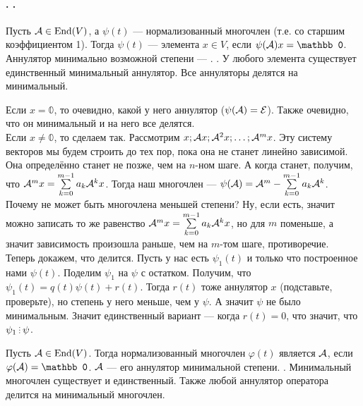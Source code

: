 \documentclass{article}
\newcommand*{\id}{{\scriptE}}
\begin{document}
    \paragraph{. .}
    \begin{itemize}
        \dfn Пусть ${\mathcal{A}}\in\operatorname{End}(V)$, а $\psi(t)$ --- нормализованный многочлен (т.е. со старшим коэффициентом 1). Тогда $\psi(t)$ ---  элемента $x\in V$, если $\psi(\scriptA)x=\mathbb 0$.
        \dfn Аннулятор минимально возможной степени --- .
        \thm {}. У любого элемента существует единственный минимальный аннулятор. Все аннуляторы делятся на минимальный.
        \begin{Proof}
            Если $x=\mathbb0$, то очевидно, какой у него аннулятор ($\psi(\scriptA)=\id$). Также очевидно, что он минимальный и на него все делятся.\\
            Если $x\neq\mathbb0$, то сделаем так. Рассмотрим $x;{\mathcal{A}} x;{\mathcal{A}}^2 x;\ldots;{\mathcal{A}}^m x$. Эту систему векторов мы будем строить до тех пор, пока она не станет линейно зависимой. Она определённо станет не позже, чем на $n$-ном шаге. А когда станет, получим, что ${\mathcal{A}}^m x=\sum\limits_{k=0}^{m-1}a_k{\mathcal{A}}^k x$. Тогда наш многочлен --- $\psi({\mathcal{A}})={\mathcal{A}}^m-\sum\limits_{k=0}^{m-1}a_k{\mathcal{A}}^k$. Почему не может быть многочлена меньшей степени? Ну, если есть, значит можно записать то же равенство ${\mathcal{A}}^m x=\sum\limits_{k=0}^{m-1}a_k{\mathcal{A}}^k x$, но для $m$ поменьше, а значит зависимость произошла раньше, чем на $m$-том шаге, противоречие.\\
            Теперь докажем, что делится. Пусть у нас есть $\psi_1(t)$ и только что построенное нами $\psi(t)$. Поделим $\psi_1$ на $\psi$ с остатком. Получим, что $\psi_1(t)=q(t)\psi(t)+r(t)$. Тогда $r(t)$ тоже аннулятор $x$ (подставьте, проверьте), но степень у него меньше, чем у $\psi$. А значит $\psi$ не было минимальным. Значит единственный вариант --- когда $r(t)=0$, что значит, что $\psi_1\divby\psi$.
        \end{Proof}
        \dfn Пусть ${\mathcal{A}}\in\operatorname{End}(V)$. Тогда нормализованный многочлен $\varphi(t)$ является  ${\mathcal{A}}$, если $\varphi(\scriptA)=\mathbb0$.
        \dfn {} ${\mathcal{A}}$ --- его аннулятор минимальной степени.
        \thm {}. Минимальный многочлен существует и единственный. Также любой аннулятор оператора делится на минимальный многочлен.

\end{itemize}
\end{document}
